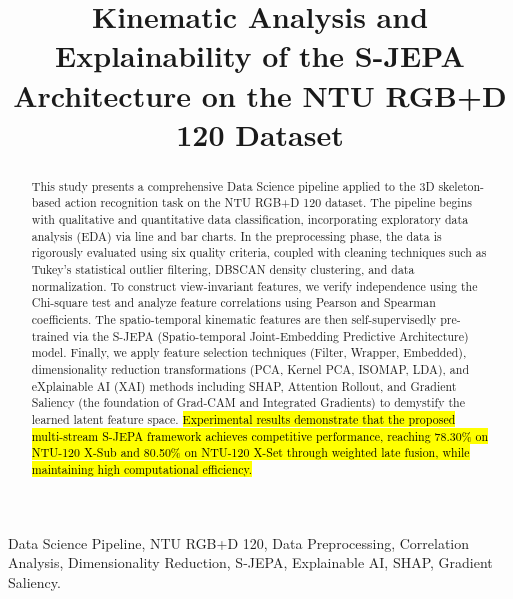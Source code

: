 \documentclass[conference]{IEEEtran}
\begin{document}
\raggedbottom

\title{Kinematic Analysis and Explainability of the S-JEPA Architecture on the NTU RGB+D 120 Dataset}

\author{
}

\maketitle

\begin{abstract}
This study presents a comprehensive Data Science pipeline applied to the 3D skeleton-based action recognition task on the NTU RGB+D 120 dataset. The pipeline begins with qualitative and quantitative data classification, incorporating exploratory data analysis (EDA) via line and bar charts. In the preprocessing phase, the data is rigorously evaluated using six quality criteria, coupled with cleaning techniques such as Tukey's statistical outlier filtering, DBSCAN density clustering, and data normalization. To construct view-invariant features, we verify independence using the Chi-square test and analyze feature correlations using Pearson and Spearman coefficients. The spatio-temporal kinematic features are then self-supervisedly pre-trained via the S-JEPA (Spatio-temporal Joint-Embedding Predictive Architecture) model. Finally, we apply feature selection techniques (Filter, Wrapper, Embedded), dimensionality reduction transformations (PCA, Kernel PCA, ISOMAP, LDA), and eXplainable AI (XAI) methods including SHAP, Attention Rollout, and Gradient Saliency (the foundation of Grad-CAM and Integrated Gradients) to demystify the learned latent feature space. \hl{Experimental results demonstrate that the proposed multi-stream S-JEPA framework achieves competitive performance, reaching 78.30\% on NTU-120 X-Sub and 80.50\% on NTU-120 X-Set through weighted late fusion, while maintaining high computational efficiency.}
\end{abstract}

\begin{IEEEkeywords}
Data Science Pipeline, NTU RGB+D 120, Data Preprocessing, Correlation Analysis, Dimensionality Reduction, S-JEPA, Explainable AI, SHAP, Gradient Saliency.
\end{IEEEkeywords}
\end{document}
